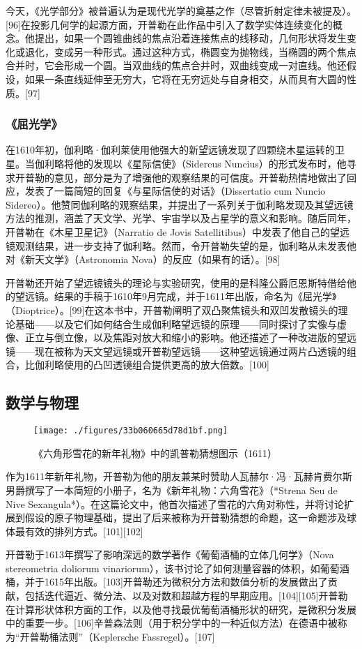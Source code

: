 今天，《光学部分》被普遍认为是现代光学的奠基之作（尽管折射定律未被提及）。[96]在投影几何学的起源方面，开普勒在此作品中引入了数学实体连续变化的概念。他提出，如果一个圆锥曲线的焦点沿着连接焦点的线移动，几何形状将发生变化或退化，变成另一种形式。通过这种方式，椭圆变为抛物线，当椭圆的两个焦点合并时，它会形成一个圆。当双曲线的焦点合并时，双曲线变成一对直线。他还假设，如果一条直线延伸至无穷大，它将在无穷远处与自身相交，从而具有大圆的性质。[97]
\subsubsection{《屈光学》}
在1610年初，伽利略·伽利莱使用他强大的新望远镜发现了四颗绕木星运转的卫星。当伽利略将他的发现以《星际信使》（Sidereus Nuncius）的形式发布时，他寻求开普勒的意见，部分是为了增强他的观察结果的可信度。开普勒热情地做出了回应，发表了一篇简短的回复《与星际信使的对话》（Dissertatio cum Nuncio Sidereo）。他赞同伽利略的观察结果，并提出了一系列关于伽利略发现及其望远镜方法的推测，涵盖了天文学、光学、宇宙学以及占星学的意义和影响。随后同年，开普勒在《木星卫星记》（Narratio de Jovis Satellitibus）中发表了他自己的望远镜观测结果，进一步支持了伽利略。然而，令开普勒失望的是，伽利略从未发表他对《新天文学》（Astronomia Nova）的反应（如果有的话）。[98]

开普勒还开始了望远镜镜头的理论与实验研究，使用的是科隆公爵厄恩斯特借给他的望远镜。结果的手稿于1610年9月完成，并于1611年出版，命名为《屈光学》（Dioptrice）。[99]在这本书中，开普勒阐明了双凸聚焦镜头和双凹发散镜头的理论基础——以及它们如何结合生成伽利略望远镜的原理——同时探讨了实像与虚像、正立与倒立像，以及焦距对放大和缩小的影响。他还描述了一种改进版的望远镜——现在被称为天文望远镜或开普勒望远镜——这种望远镜通过两片凸透镜的组合，比伽利略使用的凸凹透镜组合提供更高的放大倍数。[100]
\subsection{数学与物理}
\begin{figure}[ht]
\centering
\texttt{[image: ./figures/33b060665d78d1bf.png]}
\caption{《六角形雪花的新年礼物》中的凯普勒猜想图示（1611）} \label{fig_KPL1_17}
\end{figure}
作为1611年新年礼物，开普勒为他的朋友兼某时赞助人瓦赫尔·冯·瓦赫肯费尔斯男爵撰写了一本简短的小册子，名为《新年礼物：六角雪花》（*Strena Seu de Nive Sexangula*）。在这篇论文中，他首次描述了雪花的六角对称性，并将讨论扩展到假设的原子物理基础，提出了后来被称为开普勒猜想的命题，这一命题涉及球体最有效的排列方式。[101][102]

开普勒于1613年撰写了影响深远的数学著作《葡萄酒桶的立体几何学》（Nova stereometria doliorum vinariorum），该书讨论了如何测量容器的体积，如葡萄酒桶，并于1615年出版。[103]开普勒还为微积分方法和数值分析的发展做出了贡献，包括迭代逼近、微分法、以及对数和超越方程的早期应用。[104][105]开普勒在计算形状体积方面的工作，以及他寻找最优葡萄酒桶形状的研究，是微积分发展中的重要一步。[106]辛普森法则（用于积分学中的一种近似方法）在德语中被称为“开普勒桶法则”（Keplersche Fassregel）。[107]
